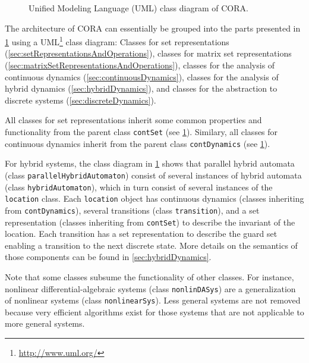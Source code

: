 \begin{figure}[h!tb]

    \caption{Unified Modeling Language (UML) class diagram of CORA.}
    \label{fig:classDiagram}
\end{figure}


The architecture of CORA can essentially be grouped into the parts presented in \cref{fig:classDiagram} using a UML\footnote{\url{http://www.uml.org/}} class diagram: Classes for set representations (\cref{sec:setRepresentationsAndOperations}), classes for matrix set representations (\cref{sec:matrixSetRepresentationsAndOperations}), classes for the analysis of continuous dynamics (\cref{sec:continuousDynamics}), classes for the analysis of hybrid dynamics (\cref{sec:hybridDynamics}), and classes for the abstraction to discrete systems (\cref{sec:discreteDynamics}).

All classes for set representations inherit some common properties and functionality from the parent class \texttt{contSet} (see \cref{fig:classDiagram}). Similary, all classes for continuous dynamics inherit from the parent class \texttt{contDynamics} (see \cref{fig:classDiagram}).

For hybrid systems, the class diagram in \cref{fig:classDiagram} shows that parallel hybrid automata (class \texttt{parallelHybridAutomaton}) consist of several instances of hybrid automata (class \linebreak[4]\texttt{hybridAutomaton}), which in turn consist of several instances of the \texttt{location} class. Each \texttt{location} object has continuous dynamics (classes inheriting from \texttt{contDynamics}), several transitions (class \texttt{transition}), and a set representation (classes inheriting from \texttt{contSet}) to describe the invariant of the location. Each transition has a set representation to describe the guard set enabling a transition to the next discrete state. More details on the semantics of those components can be found in \cref{sec:hybridDynamics}.

Note that some classes subsume the functionality of other classes. For instance, nonlinear differential-algebraic systems (class \texttt{nonlinDASys}) are a generalization of nonlinear systems (class \texttt{nonlinearSys}). Less general systems are not removed because very efficient algorithms exist for those systems that are not applicable to more general systems. 